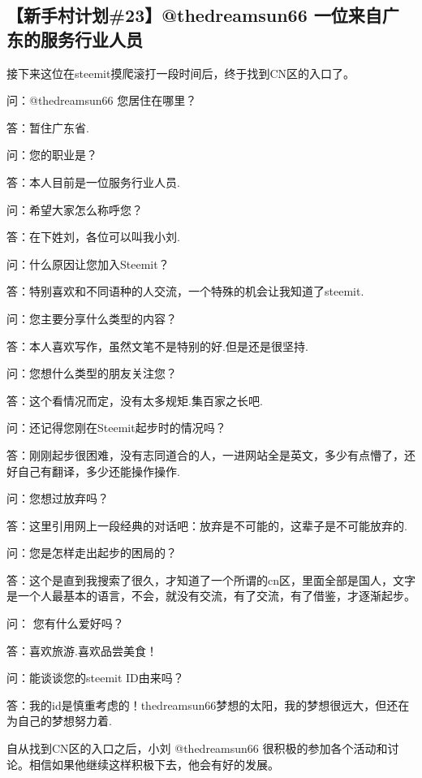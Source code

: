 \documentclass[]{ctexbook}
\begin{document}
\hypertarget{23thedreamsun66-}{%
\subsection{【新手村计划\#23】@thedreamsun66 一位来自广东的服务行业人员}\label{23thedreamsun66-}}

接下来这位在steemit摸爬滚打一段时间后，终于找到CN区的入口了。

问：@thedreamsun66 您居住在哪里？

答：暂住广东省.

问：您的职业是？

答：本人目前是一位服务行业人员.

问：希望大家怎么称呼您？

答：在下姓刘，各位可以叫我小刘.

问：什么原因让您加入Steemit？

答：特别喜欢和不同语种的人交流，一个特殊的机会让我知道了steemit.

问：您主要分享什么类型的内容？

答：本人喜欢写作，虽然文笔不是特别的好.但是还是很坚持.

问：您想什么类型的朋友关注您？

答：这个看情况而定，没有太多规矩.集百家之长吧.

问：还记得您刚在Steemit起步时的情况吗？

答：刚刚起步很困难，没有志同道合的人，一进网站全是英文，多少有点懵了，还好自己有翻译，多少还能操作操作.

问：您想过放弃吗？

答：这里引用网上一段经典的对话吧：放弃是不可能的，这辈子是不可能放弃的.

问：您是怎样走出起步的困局的？

答：这个是直到我搜索了很久，才知道了一个所谓的cn区，里面全部是国人，文字是一个人最基本的语言，不会，就没有交流，有了交流，有了借鉴，才逐渐起步。

问： 您有什么爱好吗？

答：喜欢旅游.喜欢品尝美食！

问：能谈谈您的steemit ID由来吗？

答：我的id是慎重考虑的！thedreamsun66梦想的太阳，我的梦想很远大，但还在为自己的梦想努力着.

自从找到CN区的入口之后，小刘 @thedreamsun66 很积极的参加各个活动和讨论。相信如果他继续这样积极下去，他会有好的发展。
\end{document}
